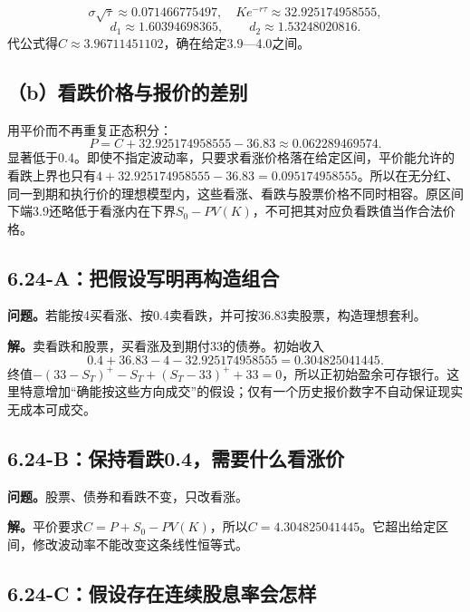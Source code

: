 \documentclass[11pt,a4paper,UTF8,fontset=fandol]{ctexart}
\begin{document}
\[\sigma\sqrt\tau\approx0.071466775497,\quad
Ke^{-r\tau}\approx32.925174958555,\]
\[d_1\approx1.60394698365,\qquad d_2\approx1.53248020816.\]
代公式得\(\boxed{C\approx3.96711451102}\)，确在给定3.9---4.0之间。

\subsection{（b）看跌价格与报价的差别}\label{bux770bux8dccux4ef7ux683cux4e0eux62a5ux4ef7ux7684ux5deeux522b}

用平价而不再重复正态积分：
\[\boxed{P=C+32.925174958555-36.83\approx0.062289469574.}\]
显著低于0.4。即使不指定波动率，只要求看涨价格落在给定区间，平价能允许的看跌上界也只有\(4+32.925174958555-36.83=0.095174958555\)。所以在无分红、同一到期和执行价的理想模型内，这些看涨、看跌与股票价格不同时相容。原区间下端3.9还略低于看涨内在下界\(S_0-PV(K)\)，不可把其对应负看跌值当作合法价格。

\subsection{6.24-A：把假设写明再构造组合}\label{aux628aux5047ux8bbeux5199ux660eux518dux6784ux9020ux7ec4ux5408}

\textbf{问题。}若能按4买看涨、按0.4卖看跌，并可按36.83卖股票，构造理想套利。

\textbf{解。}卖看跌和股票，买看涨及到期付33的债券。初始收入
\[0.4+36.83-4-32.925174958555=\boxed{0.304825041445}.\]
终值\(-(33-S_T)^+-S_T+(S_T-33)^++33=0\)，所以正初始盈余可存银行。这里特意增加``确能按这些方向成交''的假设；仅有一个历史报价数字不自动保证现实无成本可成交。

\subsection{6.24-B：保持看跌0.4，需要什么看涨价}\label{bux4fddux6301ux770bux8dcc0.4ux9700ux8981ux4ec0ux4e48ux770bux6da8ux4ef7}

\textbf{问题。}股票、债券和看跌不变，只改看涨。

\textbf{解。}平价要求\(C=P+S_0-PV(K)\)，所以\(\boxed{C=4.304825041445}\)。它超出给定区间，修改波动率不能改变这条线性恒等式。

\subsection{6.24-C：假设存在连续股息率会怎样}\label{cux5047ux8bbeux5b58ux5728ux8fdeux7eedux80a1ux606fux7387ux4f1aux600eux6837}
\end{document}
